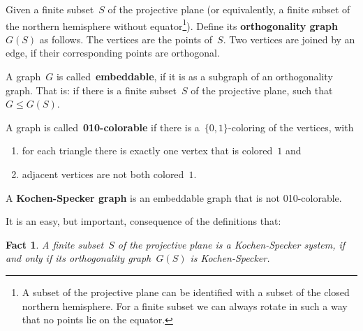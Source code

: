 \documentclass{report}
\newcommand{\keyword}[1]{\textbf{#1}}
\newtheorem{fact}{Fact}[section]
\begin{document}
\begin{definition}
Given a finite subset~$S$ of the projective plane
(or equivalently, a finite subset of the northern
hemisphere without equator\footnote{%
    A subset of the projective plane can be identified with
    a subset of the closed northern hemisphere.
    For a finite subset we can always rotate in such a way
    that no points lie on the equator.}).
Define its \keyword{orthogonality graph}~$G(S)$ as follows.
The vertices are the points of~$S$.
Two vertices are joined by an edge, if their corresponding points
are orthogonal.
\end{definition}
\begin{definition}
A graph~$G$ is called~\keyword{embeddable},
if it is as a subgraph of an orthogonality graph.
That is: if there is a finite subset~$S$ of the projective plane,
such that~$G \leq G(S)$.
\end{definition}
\begin{definition}
A graph is called~\keyword{010-colorable}
if there is a~$\{0,1\}$-coloring of the vertices,
with
\begin{enumerate}
\item
for each triangle there is exactly one vertex that is colored~$1$ and
\item
adjacent vertices are not both colored~$1$.
\end{enumerate}
\end{definition}


\begin{definition}
A \keyword{Kochen-Specker graph}
is an embeddable graph that is not 010-colorable.
\end{definition}
It is an easy, but important, consequence of the definitions that:
\begin{fact}
    A finite subset~$S$ of the projective plane
    is a Kochen-Specker system,
    if and only if its orthogonality graph~$G(S)$
    is Kochen-Specker.
\end{fact}
\end{document}

